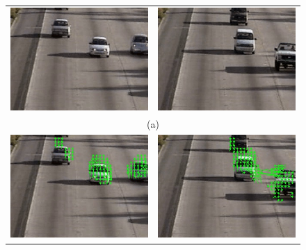 \documentclass[journal]{IEEEtran}
\begin{document}
\begin{figure}[h]
  \centering  
    \begin{tabular}{cc}
	\includegraphics[scale = 0.3]{./images/frame1.jpg}& 
	\includegraphics[scale = 0.3]{./images/frame2.jpg} \\
		     \multicolumn{2}{c}{\scriptsize(a) }  \\
	\includegraphics[scale = 0.3]{./images/flux1.jpg} &
	\includegraphics[scale = 0.3]{./images/flux2.jpg}\\

\end{tabular}
\end{figure}
\end{document}
